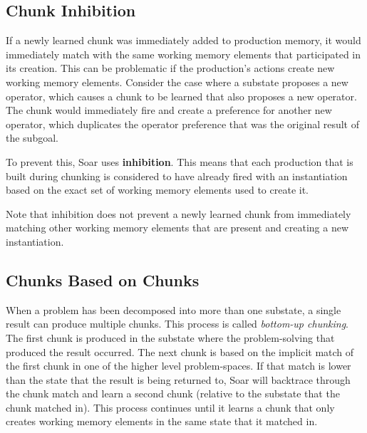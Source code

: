 \subsection{Chunk Inhibition}
\label{CHUNKING-subtleties-inhibition}

If a newly learned chunk was immediately added to production memory, it would immediately match with the same working memory elements that participated in its creation.  This can be problematic if the production's actions create new working memory elements.  Consider the case where a substate proposes a new operator, which causes a chunk to be learned that also proposes a new operator. The chunk would immediately fire and create a preference for another new operator, which duplicates the operator preference that was the original result of the subgoal.

To prevent this, Soar uses \textbf{inhibition}. This means that each production that is built during chunking is considered to have already fired with an instantiation based on the exact set of working memory elements used to create it.

Note that inhibition does not prevent a newly learned chunk from immediately matching other working memory elements that are present and creating a new instantiation.

\subsection{Chunks Based on Chunks}
\label{CHUNKING-subtleties-chunkchunks}

When a problem has been decomposed into more than one substate, a single result can produce multiple chunks.  This process is called \textit{bottom-up chunking}.  The first chunk is produced in the substate where the problem-solving that produced the result occurred.  The next chunk is based on the implicit match of the first chunk in one of the higher level problem-spaces.  If that match is lower than the state that the result is being returned to, Soar will backtrace through the chunk match and learn a second chunk (relative to the substate that the chunk matched in).  This process continues until it learns a chunk that only creates working memory elements in the same state that it matched in.

